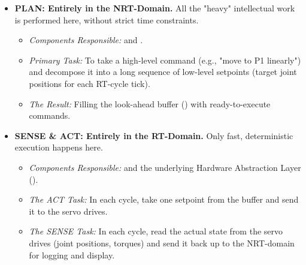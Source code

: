 \begin{itemize}
    \item \textbf{PLAN: Entirely in the NRT-Domain.} All the "heavy" intellectual work is performed here, without strict time constraints. 
    \begin{itemize}
        \item \textit{Components Responsible:}  and .
        \item \textit{Primary Task:} To take a high-level command (e.g., "move to P1 linearly") and decompose it into a long sequence of low-level setpoints (target joint positions for each RT-cycle tick).
        \item \textit{The Result:} Filling the look-ahead buffer () with ready-to-execute commands.
    \end{itemize}

    \item \textbf{SENSE \& ACT: Entirely in the RT-Domain.} Only fast, deterministic execution happens here.
    \begin{itemize}
        \item \textit{Components Responsible:}  and the underlying Hardware Abstraction Layer ().
        \item \textit{The ACT Task:} In each cycle, take one setpoint from the buffer and send it to the servo drives.
        \item \textit{The SENSE Task:} In each cycle, read the actual state from the servo drives (joint positions, torques) and send it back up to the NRT-domain for logging and display.
    \end{itemize}
\end{itemize}

